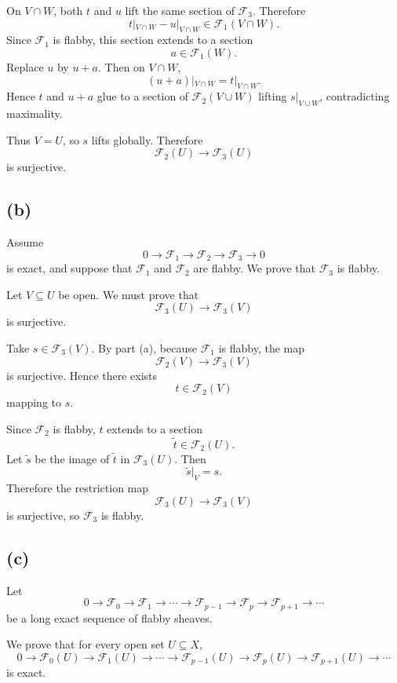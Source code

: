 On $V\cap W$, both $t$ and $u$ lift the same section of $\mathcal F_3$.
Therefore
\[
t|_{V\cap W}-u|_{V\cap W}\in \mathcal F_1(V\cap W).
\]
Since $\mathcal F_1$ is flabby, this section extends to a section
\[
a\in \mathcal F_1(W).
\]
Replace $u$ by $u+a$. Then on $V\cap W$,
\[
(u+a)|_{V\cap W}=t|_{V\cap W}.
\]
Hence $t$ and $u+a$ glue to a section of $\mathcal F_2(V\cup W)$ lifting
$s|_{V\cup W}$, contradicting maximality.

Thus $V=U$, so $s$ lifts globally. Therefore
\[
\mathcal F_2(U)\longrightarrow \mathcal F_3(U)
\]
is surjective.

\subsection*{(b)}

Assume
\[
0 \longrightarrow \mathcal F_1
\longrightarrow \mathcal F_2
\longrightarrow \mathcal F_3
\longrightarrow 0
\]
is exact, and suppose that $\mathcal F_1$ and $\mathcal F_2$ are flabby.
We prove that $\mathcal F_3$ is flabby.

Let $V\subseteq U$ be open. We must prove that
\[
\mathcal F_3(U)\longrightarrow \mathcal F_3(V)
\]
is surjective.

Take $s\in \mathcal F_3(V)$. By part (a), because $\mathcal F_1$ is flabby,
the map
\[
\mathcal F_2(V)\longrightarrow \mathcal F_3(V)
\]
is surjective. Hence there exists
\[
t\in \mathcal F_2(V)
\]
mapping to $s$.

Since $\mathcal F_2$ is flabby, $t$ extends to a section
\[
\widetilde t\in \mathcal F_2(U).
\]
Let $\widetilde s$ be the image of $\widetilde t$ in $\mathcal F_3(U)$.
Then
\[
\widetilde s|_V=s.
\]
Therefore the restriction map
\[
\mathcal F_3(U)\longrightarrow \mathcal F_3(V)
\]
is surjective, so $\mathcal F_3$ is flabby.

\subsection*{(c)}

Let
\[
0\longrightarrow \mathcal F_0
\longrightarrow \mathcal F_1
\longrightarrow \cdots
\longrightarrow \mathcal F_{p-1}
\longrightarrow \mathcal F_p
\longrightarrow \mathcal F_{p+1}
\longrightarrow \cdots
\]
be a long exact sequence of flabby sheaves.

We prove that for every open set $U\subseteq X$,
\[
0\longrightarrow \mathcal F_0(U)
\longrightarrow \mathcal F_1(U)
\longrightarrow \cdots
\longrightarrow \mathcal F_{p-1}(U)
\longrightarrow \mathcal F_p(U)
\longrightarrow \mathcal F_{p+1}(U)
\longrightarrow \cdots
\]
is exact.

